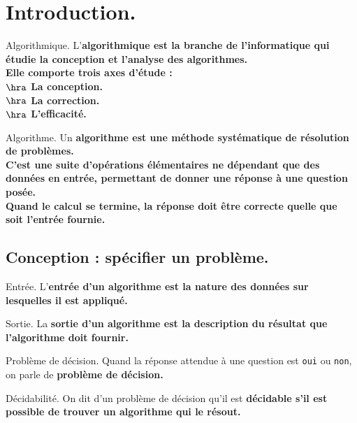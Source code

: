 \documentclass[french, 11pt]{article}
\begin{document}


\section{Introduction.}

\begin{defi}{Algorithmique.}{}
    L'\bf{algorithmique} est la branche de l'informatique qui étudie la conception et l'analyse des algorithmes.\\
    Elle comporte trois axes d'étude :\\
    $\hra$ La conception.\\
    $\hra$ La correction.\\
    $\hra$ L'efficacité.
\end{defi}

\begin{defi}{Algorithme.}{}
    Un \bf{algorithme} est une méthode systématique de résolution de problèmes.\\
    C'est une suite d'opérations élémentaires ne dépendant que des données en entrée, permettant de donner une réponse à une question posée.\\
    Quand le calcul se termine, la réponse doit être correcte quelle que soit l'entrée fournie.
\end{defi}

\subsection{Conception : spécifier un problème.}

\begin{defi}{Entrée.}{}
    L'\bf{entrée} d'un algorithme est la nature des données sur lesquelles il est appliqué.
\end{defi}

\begin{defi}{Sortie.}{}
    La \bf{sortie} d'un algorithme est la description du résultat que l'algorithme doit fournir.
\end{defi}

\begin{defi}{Problème de décision.}{}
    Quand la réponse attendue à une question est \texttt{oui} ou \texttt{non}, on parle de \bf{problème de décision}.
\end{defi}

\begin{defi}{Décidabilité.}{}
    On dit d'un problème de décision qu'il est \bf{décidable} s'il est possible de trouver un algorithme qui le résout.
\end{defi}
\end{document}
